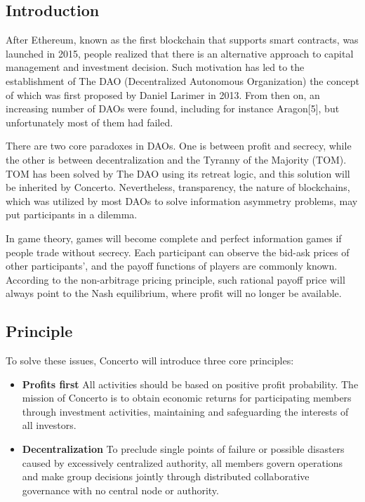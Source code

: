 \documentclass[UTF8]{article}
\begin{document}
\begin{multicols}{2}

\section{Introduction}

After Ethereum\cite{ETH}, known as the first blockchain that supports smart contracts, was launched in 2015, people realized that there is an alternative approach to capital management and investment decision. Such motivation has led to the establishment of The DAO (Decentralized Autonomous Organization)\cite{thedao} the concept of which was first proposed by Daniel Larimer in 2013\cite{bm}. From then on, an increasing number of DAOs were found, including for instance Aragon[5], but unfortunately most of them had failed.

There are two core paradoxes in DAOs. One is between profit and secrecy, while the other is between decentralization and the Tyranny of the Majority (TOM). TOM has been solved by The DAO\cite{thedao} using its retreat logic, and this solution will be inherited by Concerto. Nevertheless, transparency, the nature of blockchains, which was utilized by most DAOs to solve information asymmetry problems, may put participants in a dilemma.

In game theory\cite{gamet}, games will become complete and perfect information games if people trade without secrecy. Each participant can observe the bid-ask prices of other participants', and the payoff functions of players are commonly known. According to the non-arbitrage pricing principle, such rational payoff price will always point to the Nash equilibrium, where profit will no longer be available.


\subsection{Principle}
To solve these issues, Concerto will introduce three core principles:


\begin{itemize}
\item \textbf{Profits first}
   All activities should be based on positive profit probability. The mission of Concerto is to obtain economic returns for participating members through investment activities, maintaining and safeguarding the interests of all investors.


 \item \textbf{Decentralization}
   To preclude single points of failure or possible disasters caused by excessively centralized authority, all members govern operations and make group decisions jointly through distributed collaborative governance with no central node or authority.


\end{itemize}
\end{multicols}
\end{document}
